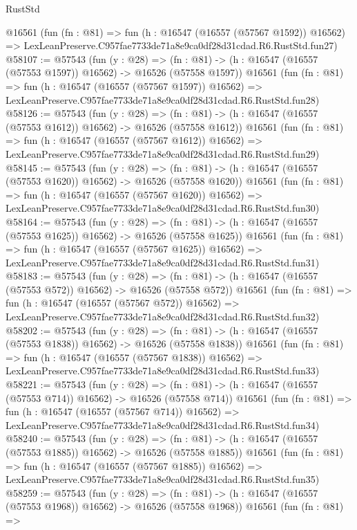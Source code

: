 \begin{lexlean}{RustStd}
\begin{coremodule}
    @16561
    (fun (fn : @81) =>
    fun (h : @16547 (@16557 (@57567 @1592)) @16562) =>
    LexLeanPreserve.C957fae7733de71a8e9ca0df28d31cdad.R6.RustStd.fun27)
@58107 := @57543
    (fun (y : @28) =>
    (fn : @81) -> (h : @16547 (@16557 (@57553 @1597)) @16562) -> @16526 (@57558 @1597))
    @16561
    (fun (fn : @81) =>
    fun (h : @16547 (@16557 (@57567 @1597)) @16562) =>
    LexLeanPreserve.C957fae7733de71a8e9ca0df28d31cdad.R6.RustStd.fun28)
@58126 := @57543
    (fun (y : @28) =>
    (fn : @81) -> (h : @16547 (@16557 (@57553 @1612)) @16562) -> @16526 (@57558 @1612))
    @16561
    (fun (fn : @81) =>
    fun (h : @16547 (@16557 (@57567 @1612)) @16562) =>
    LexLeanPreserve.C957fae7733de71a8e9ca0df28d31cdad.R6.RustStd.fun29)
@58145 := @57543
    (fun (y : @28) =>
    (fn : @81) -> (h : @16547 (@16557 (@57553 @1620)) @16562) -> @16526 (@57558 @1620))
    @16561
    (fun (fn : @81) =>
    fun (h : @16547 (@16557 (@57567 @1620)) @16562) =>
    LexLeanPreserve.C957fae7733de71a8e9ca0df28d31cdad.R6.RustStd.fun30)
@58164 := @57543
    (fun (y : @28) =>
    (fn : @81) -> (h : @16547 (@16557 (@57553 @1625)) @16562) -> @16526 (@57558 @1625))
    @16561
    (fun (fn : @81) =>
    fun (h : @16547 (@16557 (@57567 @1625)) @16562) =>
    LexLeanPreserve.C957fae7733de71a8e9ca0df28d31cdad.R6.RustStd.fun31)
@58183 := @57543
    (fun (y : @28) =>
    (fn : @81) -> (h : @16547 (@16557 (@57553 @572)) @16562) -> @16526 (@57558 @572))
    @16561
    (fun (fn : @81) =>
    fun (h : @16547 (@16557 (@57567 @572)) @16562) =>
    LexLeanPreserve.C957fae7733de71a8e9ca0df28d31cdad.R6.RustStd.fun32)
@58202 := @57543
    (fun (y : @28) =>
    (fn : @81) -> (h : @16547 (@16557 (@57553 @1838)) @16562) -> @16526 (@57558 @1838))
    @16561
    (fun (fn : @81) =>
    fun (h : @16547 (@16557 (@57567 @1838)) @16562) =>
    LexLeanPreserve.C957fae7733de71a8e9ca0df28d31cdad.R6.RustStd.fun33)
@58221 := @57543
    (fun (y : @28) =>
    (fn : @81) -> (h : @16547 (@16557 (@57553 @714)) @16562) -> @16526 (@57558 @714))
    @16561
    (fun (fn : @81) =>
    fun (h : @16547 (@16557 (@57567 @714)) @16562) =>
    LexLeanPreserve.C957fae7733de71a8e9ca0df28d31cdad.R6.RustStd.fun34)
@58240 := @57543
    (fun (y : @28) =>
    (fn : @81) -> (h : @16547 (@16557 (@57553 @1885)) @16562) -> @16526 (@57558 @1885))
    @16561
    (fun (fn : @81) =>
    fun (h : @16547 (@16557 (@57567 @1885)) @16562) =>
    LexLeanPreserve.C957fae7733de71a8e9ca0df28d31cdad.R6.RustStd.fun35)
@58259 := @57543
    (fun (y : @28) =>
    (fn : @81) -> (h : @16547 (@16557 (@57553 @1968)) @16562) -> @16526 (@57558 @1968))
    @16561
    (fun (fn : @81) =>

\end{coremodule}
\end{lexlean}
